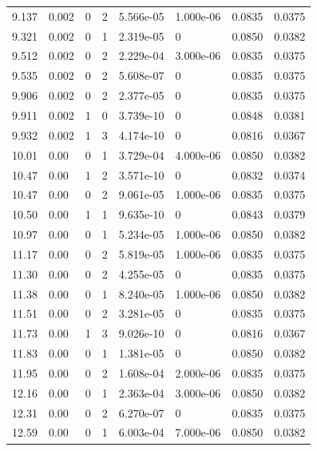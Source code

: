 \documentclass[preview]{standalone}
\begin{document}
{{{\begin{tabular}{L{1.2cm}C{1.2cm} C{0.3cm}C{0.5cm} C{1.4cm}C{1.4cm} C{1.4cm}C{1.4cm}}
  9.137  &  0.002  & 0     &  2 &  5.566e-05  & 1.000e-06  & 0.0835 &  0.0375   \\ 
  9.321  &  0.002  & 0     &  1 &  2.319e-05  & 0  & 0.0850 &  0.0382   \\ 
  9.512  &  0.002  & 0     &  2 &  2.229e-04  & 3.000e-06  & 0.0835 &  0.0375   \\ 
  9.535  &  0.002  & 0     &  2 &  5.608e-07  & 0  & 0.0835 &  0.0375   \\ 
  9.906  &  0.002  & 0     &  2 &  2.377e-05  & 0  & 0.0835 &  0.0375   \\ 
  9.911  &  0.002  & 1     &  0 &  3.739e-10  & 0  & 0.0848 &  0.0381   \\ 
  9.932  &  0.002  & 1     &  3 &  4.174e-10  & 0  & 0.0816 &  0.0367   \\ 
  10.01  &  0.00  & 0     &  1 &  3.729e-04  & 4.000e-06  & 0.0850 &  0.0382   \\ 
  10.47  &  0.00  & 1     &  2 &  3.571e-10  & 0  & 0.0832 &  0.0374   \\ 
  10.47  &  0.00  & 0     &  2 &  9.061e-05  & 1.000e-06  & 0.0835 &  0.0375   \\ 
  10.50  &  0.00  & 1     &  1 &  9.635e-10  & 0  & 0.0843 &  0.0379   \\ 
  10.97  &  0.00  & 0     &  1 &  5.234e-05  & 1.000e-06  & 0.0850 &  0.0382   \\ 
  11.17  &  0.00  & 0     &  2 &  5.819e-05  & 1.000e-06  & 0.0835 &  0.0375   \\ 
  11.30  &  0.00  & 0     &  2 &  4.255e-05  & 0  & 0.0835 &  0.0375   \\ 
  11.38  &  0.00  & 0     &  1 &  8.240e-05  & 1.000e-06  & 0.0850 &  0.0382   \\ 
  11.51  &  0.00  & 0     &  2 &  3.281e-05  & 0  & 0.0835 &  0.0375   \\ 
  11.73  &  0.00  & 1     &  3 &  9.026e-10  & 0  & 0.0816 &  0.0367   \\ 
  11.83  &  0.00  & 0     &  1 &  1.381e-05  & 0  & 0.0850 &  0.0382   \\ 
  11.95  &  0.00  & 0     &  2 &  1.608e-04  & 2.000e-06  & 0.0835 &  0.0375   \\ 
  12.16  &  0.00  & 0     &  1 &  2.363e-04  & 3.000e-06  & 0.0850 &  0.0382   \\ 
  12.31  &  0.00  & 0     &  2 &  6.270e-07  & 0  & 0.0835 &  0.0375   \\ 
  12.59  &  0.00  & 0     &  1 &  6.003e-04  & 7.000e-06  & 0.0850 &  0.0382   \\ 

\end{tabular}}}}
\end{document}
